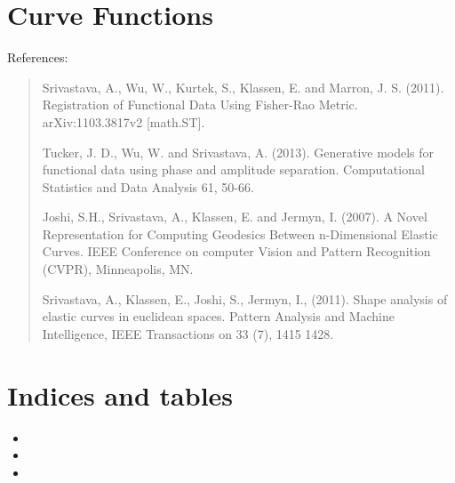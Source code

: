 \documentclass[letterpaper,10pt,english]{sphinxmanual}
\begin{document}
\chapter{Curve Functions}
\label{\detokenize{curve_functions:curve-functions}}\label{\detokenize{curve_functions::doc}}
References:
\begin{quote}

Srivastava, A., Wu, W., Kurtek, S., Klassen, E. and Marron, J. S. (2011).
Registration of Functional Data Using Fisher-Rao Metric.
arXiv:1103.3817v2 {[}math.ST{]}.

Tucker, J. D., Wu, W. and Srivastava, A. (2013). Generative models for
functional data using phase and amplitude separation. Computational
Statistics and Data Analysis 61, 50-66.

Joshi, S.H., Srivastava, A., Klassen, E. and Jermyn, I. (2007).
A Novel Representation for Computing Geodesics Between n-Dimensional
Elastic Curves. IEEE Conference on computer Vision and Pattern Recognition
(CVPR), Minneapolis, MN.

Srivastava, A., Klassen, E., Joshi, S., Jermyn, I., (2011). Shape analysis
of elastic curves in euclidean spaces. Pattern Analysis and Machine
Intelligence, IEEE Transactions on 33 (7), 1415 \textendash{}1428.
\end{quote}


\chapter{Indices and tables}
\label{\detokenize{index:indices-and-tables}}\begin{itemize}
\item {} 

\item {} 

\item {} 

\end{itemize}



\renewcommand{\indexname}{Index}
\printindex
\end{document}
